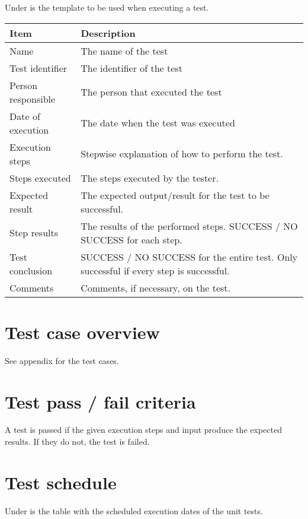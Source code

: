 \documentclass[12pt, fullpage, oneside]{report}
\begin{document}
		\vspace{8 mm}
		Under is the template to be used when executing a test.
		\vspace{8 mm}

		\begin{center}
			\begin{tabular}{ |  p{3.5cm} | p{10cm} | }
				\hline
				Item & Description \\ [5pt] \hline \hline
				Name & The name of the test \\  [5pt] \hline
				Test identifier & The identifier of the test \\  [5pt] \hline
				Person responsible & The person that executed the test \\  [5pt] \hline
				Date of execution & The date when the test was executed \\ [5pt] \hline
				Execution steps & Stepwise explanation of how to perform the test. \\  [5pt] \hline
				Steps executed & The steps executed by the tester. \\ [5pt] \hline
				Expected result & The expected output/result for the test to be successful. \\  [5pt] \hline
				Step results & The results of the performed steps. SUCCESS / NO SUCCESS for each step. \\ [5pt] \hline
				Test conclusion & SUCCESS / NO SUCCESS for the entire test. Only successful if every step is successful. \\ [5pt] \hline
				Comments & Comments, if necessary, on the test. \\ [5pt] \hline
			\end{tabular}
		\end{center}

	\newpage

	\section{Test case overview}
		See appendix for the test cases.

	\section{Test pass / fail criteria}
		A test is passed if the given execution steps and input produce the expected results. If they do not, the test is failed.

	\section {Test schedule}
		Under is the table with the scheduled execution dates of the unit tests.
\end{document}
